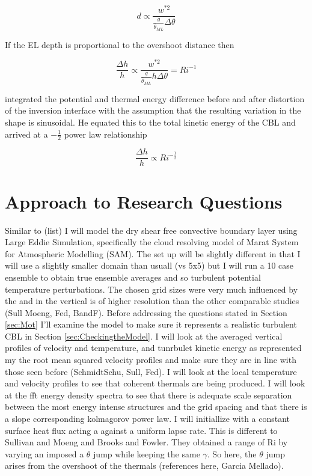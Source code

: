 \begin{equation}
d \propto \frac{w^{*2}}{\frac{g}{\overline{\theta}_{ML}} \Delta \theta} 
\end{equation} 

If the \acs{EL} depth is proportional to the overshoot distance then

\begin{equation}
\frac{\Delta h}{h} \propto \frac{w^{*2}}{\frac{g}{\overline{\theta}_{ML}} h \Delta \theta} = Ri^{-1} 
\end{equation} 

\citeauthor{Boers89} \cite{Boers89} integrated the potential and thermal energy difference before and after distortion of 
the inversion interface with the assumption that the resulting variation in the shape is sinusoidal.  He equated this to the total 
kinetic energy of the \acs{CBL} and arrived at a $-\frac{1}{2}$ power law relationship

\begin{equation}
\frac{\Delta h}{h} \propto Ri^{-\frac{1}{2}} 
\end{equation} 


\section{Approach to Research Questions}
\label{sec:Approach}

Similar to (list) I will model the dry shear free convective boundary layer using Large Eddie Simulation, specifically the cloud resolving model of Marat System for Atmospheric Modelling (SAM).  The set up will be slightly different in that I will use a slightly smaller domain than usuall (vs 5x5) but I will run a 10 case ensemble to obtain true ensemble averages and so turbulent potential temperature perturbations. The chosen grid sizes were very much influenced by the \citeauthor{SullPat} \citeyear{SullPat} and in the vertical is of higher resolution than the other comparable studies (Sull Moeng, Fed, BandF). Before addressing the questions stated in Section \ref{sec:Mot} I'll examine the model to make sure it represents a realistic turbulent \acs{CBL} in Section \ref{sec:CheckingtheModel}. I will look at the averaged vertical profiles of velocity and temperature, and tunrbulet kinetic energy as represented my the root mean squared velocity profiles and make sure they are in line with those seen before (SchmidtSchu, Sull, Fed).  I will look at the local temperature and velocity profiles to see that coherent thermals are being produced.  I will look at the fft energy density spectra to see that there is adequate scale separation between the most energy intense structures and the grid spacing and that there is a slope corresponding kolmagorov power law.  I will initiallize with a constant surface heat flux acting a against a uniform lapse rate.  This is different to Sullivan and Moeng and Brooks and Fowler.  They obtained a range of \acs{Ri} by varying an imposed a $\theta$ jump while keeping the same $\gamma$.  So here, the  $\theta$ jump arises from the overshoot of the thermals (references here, Garcia Mellado).  

